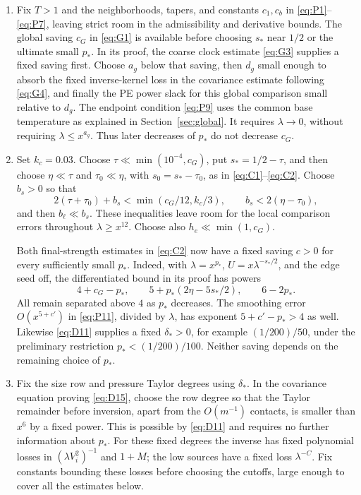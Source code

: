 \begin{enumerate}
\item Fix \(T>1\) and the neighborhoods, tapers, and constants
\(c_1,c_b\) in \eqref{eq:P1}--\eqref{eq:P7}, leaving strict room in
the admissibility and derivative bounds.  The global saving \(c_G\)
in \eqref{eq:G1} is available before choosing \(s_*\) near \(1/2\)
or the ultimate small \(p_*\).  In its proof, the coarse clock estimate
\eqref{eq:G3} supplies a fixed saving first.  Choose \(a_g\) below
that saving, then \(d_g\) small enough to absorb the fixed
inverse-kernel loss in the covariance estimate following
\eqref{eq:G4}, and finally the PE power slack
for this global comparison small relative to \(d_g\).  The endpoint
condition \eqref{eq:P9} uses the common base temperature as explained
in Section~\ref{sec:global}.  It requires \(\lambda\to0\), without
requiring \(\lambda\le x^{a_g}\).  Thus later decreases of \(p_*\)
do not decrease \(c_G\).

\item Set \(k_c=0.03\).  Choose
\(\tau\ll\min(10^{-4},c_G)\), put \(s_*=1/2-\tau\), and then
choose \(\eta\ll\tau\) and \(\tau_0\ll\eta\), with
\(s_0=s_*-\tau_0\), as in \eqref{eq:C1}--\eqref{eq:C2}.
Choose \(b_s>0\) so that
\[
 2(\tau+\tau_0)+b_s<\min(c_G/12,k_c/3),\qquad
 b_s<2(\eta-\tau_0),
\]
and then \(b_\ell\ll b_s\).  These inequalities leave room for the
local comparison errors throughout \(\lambda\ge x^{12}\).
Choose also \(h_e\ll\min(1,c_G)\).

Both final-strength estimates in \eqref{eq:C2} now have a fixed
saving \(c>0\) for every sufficiently small \(p_*\).  Indeed, with
\(\lambda=x^{p_*}\), \(U=x\lambda^{-s_*/2}\), and the edge seed
off, the differentiated bound in its proof has powers
\[
 4+c_G-p_*,\qquad 5+p_*(2\eta-5s_*/2),\qquad 6-2p_*.
\]
All remain separated above \(4\) as \(p_*\) decreases.  The
smoothing error \(O(x^{5+c'})\) in \eqref{eq:P11}, divided by
\(\lambda\), has exponent \(5+c'-p_*>4\) as well.
Likewise \eqref{eq:D11} supplies a fixed
\(\delta_*>0\), for example \((1/200)/50\), under the preliminary
restriction \(p_*<(1/200)/100\).  Neither saving depends on the
remaining choice of \(p_*\).

\item Fix the size row and pressure Taylor degrees using
\(\delta_*\).  In the covariance equation proving \eqref{eq:D15},
choose the row degree so that the Taylor remainder before inversion,
apart from the \(O(m^{-1})\) contacts, is smaller than \(x^6\) by
a fixed power.  This is possible by \eqref{eq:D11} and requires no
further information about \(p_*\).  For these fixed degrees the
inverse has fixed polynomial losses in
\((\lambda V_i^2)^{-1}\) and \(1+M\); the low sources have a fixed
loss \(\lambda^{-C}\).  Fix constants bounding these losses before
choosing the cutoffs, large enough to cover all the estimates below.


\end{enumerate}
